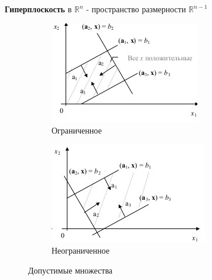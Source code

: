 \documentclass[a4paper, 14pt]{extarticle}
\numberwithin{equation}{section}
\begin{document}
\textbf{Гиперплоскость} в $\mathbb{R}^n$ - пространство размерности $\mathbb{R}^{n-1}$
\begin{figure}[h]
	\centering
	\begin{subfigure}[b]{0.45\textwidth}
		\centering
		\includegraphics[width=\textwidth]{img/S001.jpg}
		\caption{Ограниченное}
	\end{subfigure}
	\begin{subfigure}[b]{0.45\textwidth}
		\centering
		\includegraphics[width=\textwidth]{img/S002.jpg}
		\caption{Неограниченное}
	\end{subfigure}
	\caption{Допустимые множества}
\end{figure}
\end{document}
